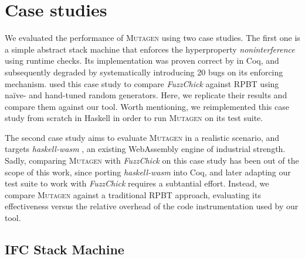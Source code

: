\documentclass[sigconf,review,anonymous]{acmart}
\newcommand{\fuzzchick}{\textit{FuzzChick}\xspace}
\newcommand{\mutagen}{\textsc{Mutagen}\xspace}
\begin{document}




\section{Case studies}
\label{sec:casestudies}

We evaluated the performance of \mutagen using two case studies.
%
The first one is a simple abstract stack machine that enforces the hyperproperty
\emph{noninterference} \cite{goguen1982security} using runtime checks.
%
Its implementation was proven correct by \citeauthor{10.1145/2578855.2535839}
\citeyearpar{10.1145/2578855.2535839} in Coq, and subsequently degraded by
systematically introducing 20 bugs on its enforcing mechanism.
%
\citeauthor{lampropoulos2019coverage} used this case study to compare \fuzzchick
against RPBT using na\"ive- and hand-tuned random generators.
%
Here, we replicate their results and compare them against our tool.
%
Worth mentioning, we reimplemented this case study from scratch in Haskell in
order to run \mutagen on its test suite.


The second case study aims to evaluate \mutagen in a realistic scenario, and
targets \textit{haskell-wasm} \cite{haskellwasm}, an existing WebAssembly engine
of industrial strength.
%
%
Sadly, comparing \mutagen with \fuzzchick on this case study has been out of the
scope of this work, since porting \textit{haskell-wasm} into Coq, and later
adapting our test suite to work with \fuzzchick requires a subtantial effort.
%
Instead, we compare \mutagen against a traditional RPBT approach, evaluating its
effectiveness versus the relative overhead of the code instrumentation used by
our tool.




\subsection{IFC Stack Machine}
\end{document}
